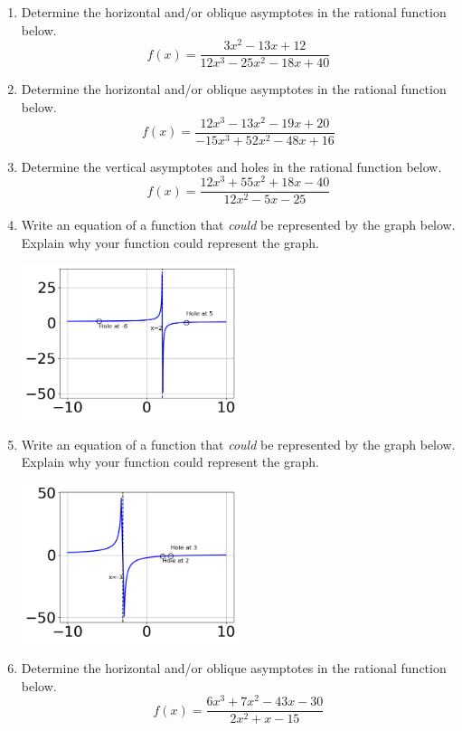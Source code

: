 \documentclass[14pt]{extbook}
\begin{document}
\begin{enumerate}
\item{
Determine the horizontal and/or oblique asymptotes in the rational function below.\[ f(x) = \frac{3x^{2} -13 x + 12}{12x^{3} -25 x^{2} -18 x + 40} \]} \newpage
\item{
Determine the horizontal and/or oblique asymptotes in the rational function below.\[ f(x) = \frac{12x^{3} -13 x^{2} -19 x + 20}{-15x^{3} +52 x^{2} -48 x + 16} \]} \newpage
\item{
Determine the vertical asymptotes and holes in the rational function below.\[ f(x) = \frac{12x^{3} +55 x^{2} +18 x -40}{12x^{2} -5 x -25} \]} \newpage
\item{
Write an equation of a function that \textit{could} be represented by the graph below. Explain why your function could represent the graph.
\begin{center}
    \includegraphics[width=0.5\textwidth]{../Figures/identifyGraphOfRationalFunctionA.png}
\end{center}
} \newpage
\item{
Write an equation of a function that \textit{could} be represented by the graph below. Explain why your function could represent the graph.
\begin{center}
    \includegraphics[width=0.5\textwidth]{../Figures/identifyGraphOfRationalFunctionCopyA.png}
\end{center}
} \newpage
\item{
Determine the horizontal and/or oblique asymptotes in the rational function below.\[ f(x) = \frac{6x^{3} +7 x^{2} -43 x -30}{2x^{2} +x -15} \]} \newpage

\end{enumerate}
\end{document}

